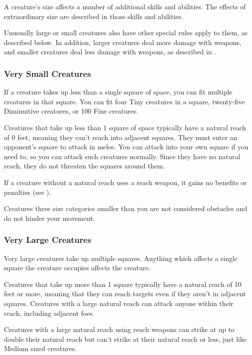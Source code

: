         A creature's size affects a number of additional skills and abilities.
        The effects of extraordinary size are described in those skills and abilities.

        Unusually large or small creatures also have other special rules apply to them, as described below.
        In addition, larger creatures deal more damage with weapons, and smaller creatures deal less damage with weapons, as described in .

        \subsubsection{Very Small Creatures}
             If a creature takes up less than a single square of space, you can fit multiple creatures in that square. You can fit four Tiny creatures in a square, twenty-five Diminuitive creatures, or 100 Fine creatures.

             Creatures that take up less than 1 square of space typically have a natural reach of 0 feet, meaning they can't reach into adjacent squares. They must enter an opponent's square to attack in melee. You can attack into your own square if you need to, so you can attack such creatures normally. Since they have no natural reach, they do not threaten the squares around them.

            If a creature without a natural reach uses a reach weapon, it gains no benefits or penalties (see ).

             Creatures three size categories smaller than you are not considered obstacles and do not hinder your movement.

        \subsubsection{Very Large Creatures}
             Very large creatures take up multiple squares. Anything which affects a single square the creature occupies affects the creature.

             Creatures that take up more than 1 square typically have a natural reach of 10 feet or more, meaning that they can reach targets even if they aren't in adjacent squares. Creatures with a large natural reach can attack anyone within their reach, including adjacent foes.

            Creatures with a large natural reach using reach weapons can strike at up to double their natural reach but can't strike at their natural reach or less, just like Medium sized creatures.

